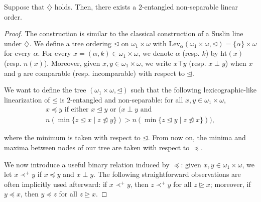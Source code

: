\documentclass[10pt,a4paper]{amsart}
\begin{document}
\begin{theorem}
Suppose that $\diamondsuit$ holds. Then, there exists a $2$-entangled non-separable linear order.
\end{theorem}

\begin{proof}
The construction is similar to the classical construction of a Suslin line under $\diamondsuit$. We define a tree ordering $\unlhd$ on $\omega_1\times \omega$ with $\mathrm{Lev}_\alpha(\omega_1 \times \omega, \unlhd) = \{\alpha\}\times \omega$ for every $\alpha$. For every $x = (\alpha, k) \in \omega_1\times\omega$, we denote $\alpha$ (resp. $k$) by $\mathrm{ht}(x)$ (resp. $n(x)$). Moreover, given $x,y \in \omega_1\times \omega$, we write $x \top y$ (resp. $x \perp y$) when $x$ and $y$ are comparable (resp. incomparable) with respect to $\unlhd$.

We want to define the tree $(\omega_1\times \omega, \unlhd)$ such that the following lexicographic-like linearization of $\unlhd$ is $2$-entangled and non-separable: for all $x,y \in \omega_1\times \omega$,
\begin{multline*}
x \preceq y \text{ if either } x \unlhd y \text{ or } \big( x \perp y \text{ and } \\
n(\min\{z \unlhd x \mid z \not\trianglelefteq y\}) >
n(\min \{z \unlhd y \mid z \not\trianglelefteq x\})\big),
\end{multline*}

\smallskip
\noindent where the minimum is taken with respect to $\unlhd$. From now on, the minima and maxima between nodes of our tree are taken with respect to $\preceq$.

We now introduce a useful binary relation induced by $\preceq$: given $x,y \in \omega_1 \times \omega$, we let $x \prec^+ y$ if $x \preceq y$ and $x \perp y$. The following straightforward observations are often implicitly used afterward: if $x \prec^+ y$, then $z \prec^+ y$ for all $z \unrhd x$; moreover, if $y \preceq x$, then $y \preceq z$ for all $z \unrhd x$.


\end{proof}
\end{document}
